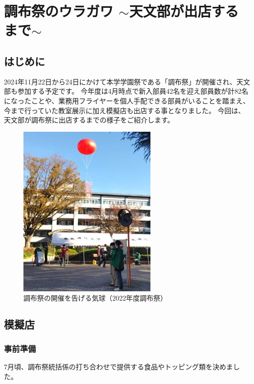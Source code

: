 \documentclass[../super_nova_20yy]{subfiles}
\begin{document}
  \chapter{調布祭のウラガワ $\sim$天文部が出店するまで$\sim$}


\section{はじめに}

2024年11月22日から24日にかけて本学学園祭である「調布祭」が開催され、天文部も参加する予定です。
今年度は4月時点で新入部員42名を迎え部員数が計82名になったことや、業務用フライヤーを個人手配できる部員がいることを踏まえ、今まで行っていた教室展示に加え模擬店も出店する事となりました。
今回は、天文部が調布祭に出店するまでの様子をご紹介します。

\begin{figure}[H]
  \centering
  \includegraphics[width=.5\columnwidth]{画像1.jpg}
  \caption{調布祭の開催を告げる気球（2022年度調布祭）}
  \label{fig:1}
\end{figure}

\section{模擬店}
\subsection{事前準備}

7月頃、調布祭統括係の打ち合わせで提供する食品やトッピング類を決めました。
\end{document}
